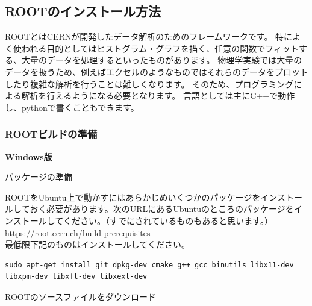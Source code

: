 \subsection{ROOTのインストール方法}

ROOTとはCERNが開発したデータ解析のためのフレームワークです。
特によく使われる目的としてはヒストグラム・グラフを描く、任意の関数でフィットする、大量のデータを処理するといったものがあります。
物理学実験では大量のデータを扱うため、例えばエクセルのようなものではそれらのデータをプロットしたり複雑な解析を行うことは難しくなります。
そのため、プログラミングによる解析を行えるようになる必要となります。
言語としては主にC++で動作し、pythonで書くこともできます。

\subsubsection{ROOTビルドの準備}

\vspace{1cm}
{\large \bf Windows版}
\vspace{0.5cm}

\vspace{0.5cm}
パッケージの準備
\vspace{0.3cm}

ROOTをUbuntu上で動かすにはあらかじめいくつかのパッケージをインストールしておく必要があります。次のURLにあるUbuntuのところのパッケージをインストールしてください。（すでにされているものもあると思います。）\\
\url{https://root.cern.ch/build-prerequisites}\\
最低限下記のものはインストールしてください。
\begin{lstlisting}
sudo apt-get install git dpkg-dev cmake g++ gcc binutils libx11-dev libxpm-dev libxft-dev libxext-dev
\end{lstlisting}

\vspace{0.3cm}
ROOTのソースファイルをダウンロード
\vspace{0.3cm}

